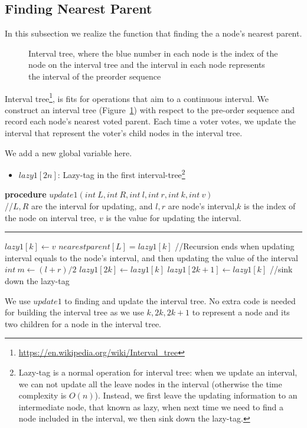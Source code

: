 \subsection{Finding Nearest Parent}
In this subsection we realize the function that finding the a node's nearest parent.

\begin{figure}
	\centering
	
	\caption{Interval tree, where the blue number in each node is the index of the node on the interval tree and the interval in each node represents the interval of the preorder sequence}
	\label{fig:3}
\end{figure}
Interval tree\footnote{\url{https://en.wikipedia.org/wiki/Interval_tree}}, is
fits for operations that aim to a continuous interval. We construct an interval
tree (Figure~\ref{fig:3}) with respect to the pre-order sequence and record each node's nearest voted parent. Each time a voter votes, we update the interval that represent the voter's child nodes in the interval tree.

We add a new global variable here.
\begin{itemize}
	\item $lazy1[2n]$: Lazy-tag in the first interval-tree\footnote{Lazy-tag is a normal operation for interval tree: when we update an interval, we can not update all the leave nodes in the interval (otherwise the time complexity is $O(n)$). Instead, we first leave the updating information to an intermediate node, that known as lazy, when next time we need to find a node included in the interval, we then sink down the lazy-tag. }
\end{itemize}

\begin{algorithm}
	\textbf{procedure} $update1(int~L,int ~R, int~l, int~r, int~k, int~v)${\color{gray}
		\\//$L,R$ are the interval for updating, and $l,r$ are node's interval,$k$ is the index of the node on interval tree, $v$ is the value for updating the interval.}
	\hrule
	{
		 {$lazy1[k] \leftarrow v$}
		 {$nearestparent[L] = lazy1[k]$}
		{\color{gray}
		//Recursion ends when updating interval equals to the node's interval, and then updating the value of the interval}
	}
	{
		$int~m \leftarrow (l+r)/2$\;
		 {$lazy1[2k] \leftarrow lazy1[k]$}
		 {$lazy1[2k+1] \leftarrow lazy1[k]${\color{gray}
			//sink down the lazy-tag}}
	}
\end{algorithm}
We use $update1$ to finding and update the interval tree. No extra code is needed for building the interval tree as we use $k,2k,2k+1$ to represent a node and its two children for a node in the interval tree.

